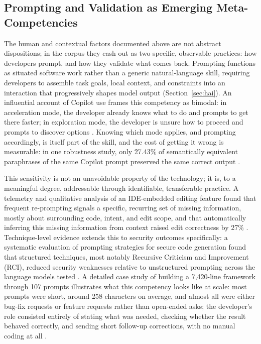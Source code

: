 \subsection{Prompting and Validation as Emerging Meta-Competencies}
\label{sec:disc-meta-competencies}
The human and contextual factors documented above are not abstract dispositions; in the corpus they cash out as two specific, observable practices: how developers prompt, and how they validate what comes back. Prompting functions as situated software work rather than a generic natural-language skill, requiring developers to assemble task goals, local context, and constraints into an interaction that progressively shapes model output (Section~\ref{sec:hai}). An influential account of Copilot use frames this competency as bimodal: in acceleration mode, the developer already knows what to do and prompts to get there faster; in exploration mode, the developer is unsure how to proceed and prompts to discover options \cite{barke_grounded_2023}. Knowing which mode applies, and prompting accordingly, is itself part of the skill, and the cost of getting it wrong is measurable: in one robustness study, only 27.43\% of semantically equivalent paraphrases of the same Copilot prompt preserved the same correct output \cite{mastropaolo_robustness_2023}.

This sensitivity is not an unavoidable property of the technology; it is, to a meaningful degree, addressable through identifiable, transferable practice. A telemetry and qualitative analysis of an IDE-embedded editing feature found that frequent re-prompting signals a specific, recurring set of missing information, mostly about surrounding code, intent, and edit scope, and that automatically inferring this missing information from context raised edit correctness by 27\% \cite{nam_understanding_2025}. Technique-level evidence extends this to security outcomes specifically: a systematic evaluation of prompting strategies for secure code generation found that structured techniques, most notably Recursive Criticism and Improvement (RCI), reduced security weaknesses relative to unstructured prompting across the language models tested \cite{tony_prompting_2025}. A detailed case study of building a 7,420-line framework through 107 prompts illustrates what this competency looks like at scale: most prompts were short, around 258 characters on average, and almost all were either bug-fix requests or feature requests rather than open-ended asks; the developer's role consisted entirely of stating what was needed, checking whether the result behaved correctly, and sending short follow-up corrections, with no manual coding at all \cite{fayed_prompt-driven_2026}.

